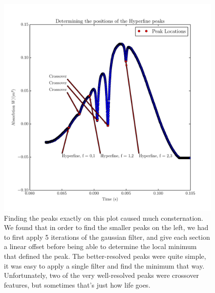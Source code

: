 \documentclass{article}
\begin{document}
  \begin{figure}
    \centering
    \includegraphics[scale=.75]{../plots/hyperfine.pdf}
    \caption{Finding the peaks exactly on this plot caused much consternation.  We found that in order to find the smaller peaks on the left, we had to first apply 5 iterations of the gaussian filter, and give each section a linear offset before being able to determine the local minimum that defined the peak.  The better-resolved peaks were quite simple, it was easy to apply a single filter and find the minimum that way.  Unfortunately, two of the very well-resolved peaks were crossover features, but sometimes that's just how life goes.}
    \label{hyperfine}
  \end{figure}

  
\end{document}
